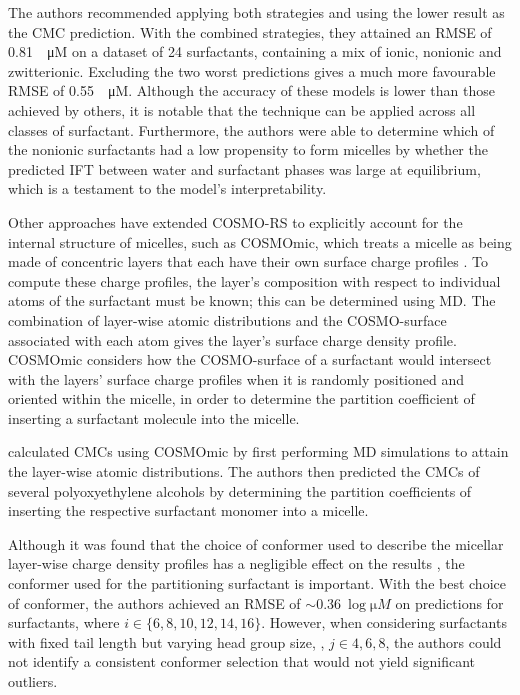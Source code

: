 The authors recommended applying both strategies and using the lower result as
the CMC prediction. With the combined strategies, they attained an RMSE of
\SI{0.81}{\log \micro M} on a dataset of 24 surfactants, containing a mix of
ionic, nonionic and zwitterionic. Excluding the two worst predictions gives a
much more favourable RMSE of \SI{0.55}{\log \micro M}. Although the accuracy of
these models is lower than those achieved by others, it is notable that the
technique can be applied across all classes of surfactant. Furthermore, the
authors were able to determine which of the nonionic surfactants had a low
propensity to form micelles by whether the predicted IFT between water and
surfactant phases was large at equilibrium, which is a testament to the model's
interpretability.

Other approaches have extended COSMO-RS to explicitly account for the internal
structure of micelles, such as COSMOmic, which treats a micelle as being made of
concentric layers that each have their own surface charge profiles
\cite{klamtCOSMOmicMechanisticApproach2008}. To compute these charge profiles,
the layer's composition with respect to individual atoms of the surfactant must
be known; this can be determined using MD. The combination of layer-wise atomic
distributions and the COSMO-surface associated with each atom gives the layer's
surface charge density profile. COSMOmic considers how the COSMO-surface of a
surfactant would intersect with the layers' surface charge profiles when it is
randomly positioned and oriented within the micelle, in order to determine the
partition coefficient of inserting a surfactant molecule into the micelle.

\citet{jakobtorweihenPredictingCriticalMicelle2017} calculated CMCs using
COSMOmic by first performing MD simulations to attain the layer-wise atomic
distributions. The authors then predicted the CMCs of several polyoxyethylene
alcohols by determining the partition coefficients of inserting the respective
surfactant monomer into a micelle.

Although it was found that the choice of conformer used to describe the micellar
layer-wise charge density profiles has a negligible effect on the results
\cite{jakobtorweihenCombinationCOSMOmicMolecular2013}, the conformer used for
the partitioning surfactant is important. With the best choice of conformer, the
authors achieved an RMSE of $\sim \SI{0.36}{\log \micro M}$ on predictions for
 surfactants, where $i \in \{6, 8, 10, 12, 14, 16\}$. However, when
considering surfactants with fixed tail length but varying head group size,
, $j \in {4, 6, 8}$, the authors could not identify a consistent
conformer selection that would not yield significant outliers.

